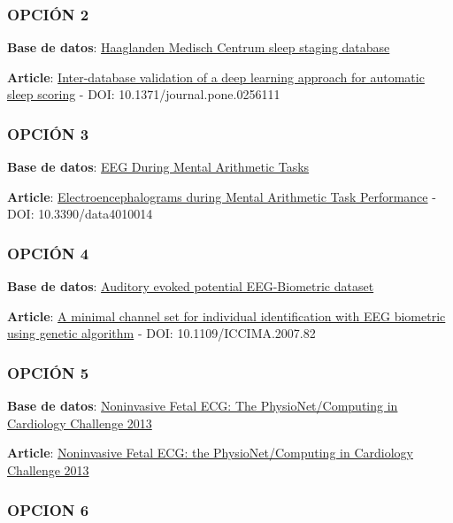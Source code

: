 \documentclass[10pt]{article}
\begin{document}
\subsubsection*{OPCIÓN 2}

\textbf{Base de datos}: \href{https://physionet.org/content/hmc-sleep-staging/1.1/}{Haaglanden Medisch Centrum sleep staging database}

\textbf{Article}: \href{https://journals.plos.org/plosone/article?id=10.1371/journal.pone.0256111}{Inter-database validation of a deep learning approach for automatic sleep scoring} - DOI: 10.1371/journal.pone.0256111

\subsubsection*{OPCIÓN 3}

\textbf{Base de datos}: \href{https://physionet.org/content/eegmat/1.0.0/}{EEG During Mental Arithmetic Tasks}

\textbf{Article}: \href{https://www.mdpi.com/2306-5729/4/1/146}{Electroencephalograms during Mental Arithmetic Task Performance} - DOI: 10.3390/data4010014

\subsubsection*{OPCIÓN 4}

\textbf{Base de datos}: \href{https://physionet.org/content/auditory-eeg/1.0.0/}{Auditory evoked potential EEG-Biometric dataset}

\textbf{Article}: \href{https://ieeexplore.ieee.org/abstract/document/4426716}{A minimal channel set for individual identification with EEG biometric using genetic algorithm} - DOI: 10.1109/ICCIMA.2007.82

\subsubsection*{OPCIÓN 5}

\textbf{Base de datos}: \href{https://physionet.org/content/challenge-2013/1.0.0/}{Noninvasive Fetal ECG: The PhysioNet/Computing in Cardiology Challenge 2013}

\textbf{Article}: \href{https://pmc.ncbi.nlm.nih.gov/articles/PMC4230703/}{Noninvasive Fetal ECG: the PhysioNet/Computing in Cardiology Challenge 2013}

\subsubsection*{OPCION 6}
\end{document}
